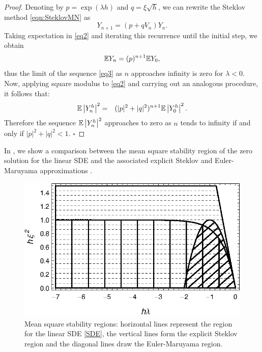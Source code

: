 	\begin{proof}
		Denoting by  $p=\exp(\lambda h)$ and  $q=\xi\sqrt{h}$, we can  rewrite the Steklov
		method \eqref{eqn:SteklovMN}  as
		\begin{equation}\label{eq2}
			Y_{n+1}=(p+qV_n)Y_n.
		\end{equation}
		Taking expectation in \eqref{eq2} and iterating this recurrence  until the initial
		step, we obtain
		\begin{equation}\label{eq3}
			\mathbb{E}Y_n=(p)^{n+1}\mathbb{E}Y_0,
		\end{equation}
		thus the limit of the sequence \eqref{eq3} as $n$ approaches infinity is zero for
		$\lambda<0$. Now, applying square modulus to \eqref{eq2}  and carrying out an
		analogous procedure, it follows that:
		\begin{eqnarray*}
			\mathbb{E}\left|Y_n^h\right|^2
			&=&(|p|^2+|q|^2)^{n+1}\mathbb{E}\left|Y_0^h\right|^2.
		\end{eqnarray*}
		Therefore the sequence $\mathbb{E}\left|Y_n^h\right|^2$ approaches to zero as $n$ tends to infinity if
		and only if  $|p|^2+|q|^2<1$. \quad$\square$
	\end{proof}
			In , we show a comparison between the mean square stability region of
	the zero solution for the linear SDE and the associated explicit Steklov and
	Euler-Maruyama approximations  \cite{Higham2000b}.
	\begin{figure}[h!]
			\begin{center}
				\includegraphics{./papers/paperA/figures/StabilityPlotMultiplicativeNoise.eps}
			\end{center}
		\caption{
			Mean square stability regions: horizontal lines represent the region for the linear
			SDE \eqref{SDE}, the vertical lines form the explicit Steklov region and the
			diagonal lines draw the Euler-Maruyama region.
		}%
			\label{fig:1}
		\end{figure}
